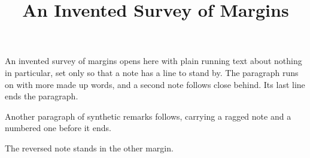 \documentclass{article}
\title{An Invented Survey of Margins}
\date{}
\begin{document}
\maketitle
An invented survey of margins opens here with plain running text about
nothing in particular, set only so that a note has a line to stand
by.
The paragraph runs on with more made up words, and a second note follows
close behind. Its last line ends the paragraph.

Another paragraph of synthetic remarks follows, carrying a ragged
note and a numbered one before
it ends.

\reversemarginpar
The reversed note stands in the other margin.
\end{document}
